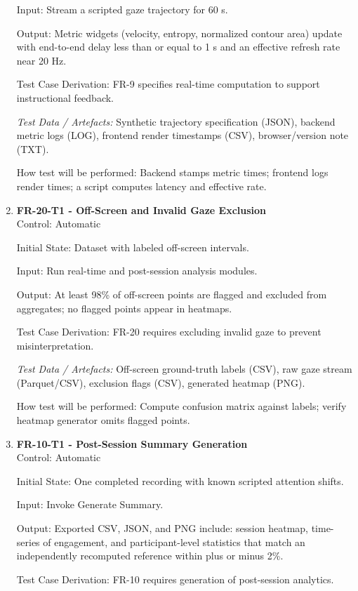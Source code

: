 \documentclass[12pt, titlepage]{article}
\begin{document}
\begin{enumerate}
Input: Stream a scripted gaze trajectory for 60 s.

Output: Metric widgets (velocity, entropy, normalized contour area) update with end-to-end delay less than or equal to 1 s and an effective refresh rate near 20 Hz.

Test Case Derivation: FR-9 specifies real-time computation to support instructional feedback.

\textit{Test Data / Artefacts:} Synthetic trajectory specification (JSON), backend metric logs (LOG), frontend render timestamps (CSV), browser/version note (TXT).

How test will be performed: Backend stamps metric times; frontend logs render times; a script computes latency and effective rate.

\item \textbf{FR-20-T1 - Off-Screen and Invalid Gaze Exclusion} \\

Control: Automatic

Initial State: Dataset with labeled off-screen intervals.

Input: Run real-time and post-session analysis modules.

Output: At least 98\% of off-screen points are flagged and excluded from aggregates; no flagged points appear in heatmaps.

Test Case Derivation: FR-20 requires excluding invalid gaze to prevent misinterpretation.

\textit{Test Data / Artefacts:} Off-screen ground-truth labels (CSV), raw gaze stream (Parquet/CSV), exclusion flags (CSV), generated heatmap (PNG).

How test will be performed: Compute confusion matrix against labels; verify heatmap generator omits flagged points.

\item \textbf{FR-10-T1 - Post-Session Summary Generation} \\

Control: Automatic

Initial State: One completed recording with known scripted attention shifts.

Input: Invoke Generate Summary.

Output: Exported CSV, JSON, and PNG include: session heatmap, time-series of engagement, and participant-level statistics that match an independently recomputed reference within plus or minus 2\%.

Test Case Derivation: FR-10 requires generation of post-session analytics.


\end{enumerate}
\end{document}
